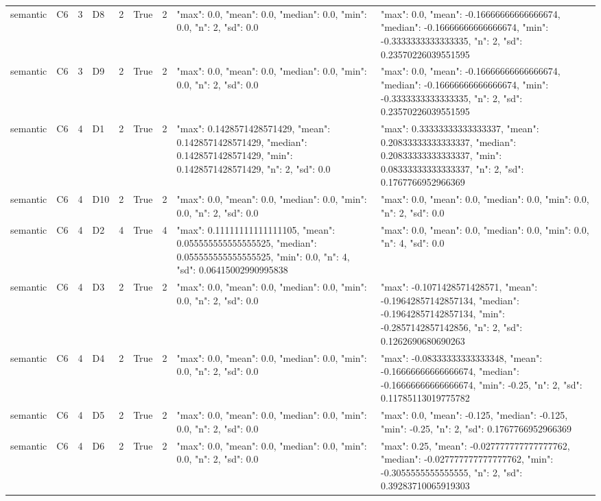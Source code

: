 \begin{tabular}{lllllllll}
semantic & C6 & 3 & D8 & 2 & True & 2 & {"max": 0.0, "mean": 0.0, "median": 0.0, "min": 0.0, "n": 2, "sd": 0.0} & {"max": 0.0, "mean": -0.16666666666666674, "median": -0.16666666666666674, "min": -0.3333333333333335, "n": 2, "sd": 0.23570226039551595} \\
semantic & C6 & 3 & D9 & 2 & True & 2 & {"max": 0.0, "mean": 0.0, "median": 0.0, "min": 0.0, "n": 2, "sd": 0.0} & {"max": 0.0, "mean": -0.16666666666666674, "median": -0.16666666666666674, "min": -0.3333333333333335, "n": 2, "sd": 0.23570226039551595} \\
semantic & C6 & 4 & D1 & 2 & True & 2 & {"max": 0.1428571428571429, "mean": 0.1428571428571429, "median": 0.1428571428571429, "min": 0.1428571428571429, "n": 2, "sd": 0.0} & {"max": 0.33333333333333337, "mean": 0.20833333333333337, "median": 0.20833333333333337, "min": 0.08333333333333337, "n": 2, "sd": 0.1767766952966369} \\
semantic & C6 & 4 & D10 & 2 & True & 2 & {"max": 0.0, "mean": 0.0, "median": 0.0, "min": 0.0, "n": 2, "sd": 0.0} & {"max": 0.0, "mean": 0.0, "median": 0.0, "min": 0.0, "n": 2, "sd": 0.0} \\
semantic & C6 & 4 & D2 & 4 & True & 4 & {"max": 0.11111111111111105, "mean": 0.055555555555555525, "median": 0.055555555555555525, "min": 0.0, "n": 4, "sd": 0.06415002990995838} & {"max": 0.0, "mean": 0.0, "median": 0.0, "min": 0.0, "n": 4, "sd": 0.0} \\
semantic & C6 & 4 & D3 & 2 & True & 2 & {"max": 0.0, "mean": 0.0, "median": 0.0, "min": 0.0, "n": 2, "sd": 0.0} & {"max": -0.1071428571428571, "mean": -0.19642857142857134, "median": -0.19642857142857134, "min": -0.2857142857142856, "n": 2, "sd": 0.1262690680690263} \\
semantic & C6 & 4 & D4 & 2 & True & 2 & {"max": 0.0, "mean": 0.0, "median": 0.0, "min": 0.0, "n": 2, "sd": 0.0} & {"max": -0.08333333333333348, "mean": -0.16666666666666674, "median": -0.16666666666666674, "min": -0.25, "n": 2, "sd": 0.11785113019775782} \\
semantic & C6 & 4 & D5 & 2 & True & 2 & {"max": 0.0, "mean": 0.0, "median": 0.0, "min": 0.0, "n": 2, "sd": 0.0} & {"max": 0.0, "mean": -0.125, "median": -0.125, "min": -0.25, "n": 2, "sd": 0.1767766952966369} \\
semantic & C6 & 4 & D6 & 2 & True & 2 & {"max": 0.0, "mean": 0.0, "median": 0.0, "min": 0.0, "n": 2, "sd": 0.0} & {"max": 0.25, "mean": -0.027777777777777762, "median": -0.027777777777777762, "min": -0.3055555555555555, "n": 2, "sd": 0.39283710065919303} \\

\end{tabular}
